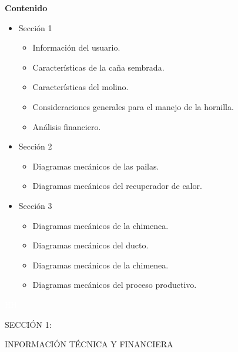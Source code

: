 \documentclass{article}%
\begin{document}
\newpage%
\begin{large}%
\begin{Large}%
\textbf{Contenido}%
\end{Large}%
\begin{itemize}%
\item%
Sección 1%
\begin{itemize}%
\item%
Información del usuario.%
\item%
Características de la caña sembrada.%
\item%
Características del molino.%
\item%
Consideraciones generales para el manejo de la hornilla.%
\item%
Análisis financiero.%
\end{itemize}%
\item%
Sección 2%
\begin{itemize}%
\item%
Diagramas mecánicos de las pailas.%
\item%
Diagramas mecánicos del recuperador de calor.%
\end{itemize}%
\item%
Sección 3%
\begin{itemize}%
\item%
Diagramas mecánicos de la chimenea.%
\item%
Diagramas mecánicos del ducto.%
\item%
Diagramas mecánicos de la chimenea.%
\item%
Diagramas mecánicos del proceso productivo.%
\end{itemize}%
\end{itemize}%
\end{large}%
\newpage%
\begin{center}%
\textcolor{white}{ 
HH
}%
\linebreak%
\linebreak%
\linebreak%
\linebreak%
\linebreak%
\linebreak%
\linebreak%
\linebreak%
\linebreak%
\linebreak%
\linebreak%
\linebreak%
\linebreak%
\linebreak%
\linebreak%
\begin{Huge}%
SECCIÓN 1:%
\end{Huge}%
\linebreak%
\begin{Huge}%
INFORMACIÓN TÉCNICA Y FINANCIERA%
\end{Huge}%
\end{center}%
\end{document}
